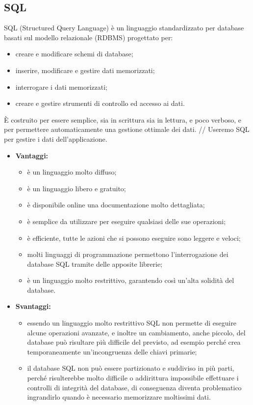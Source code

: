 \subsection{SQL}
	SQL (Structured Query Language) è un linguaggio standardizzato per database basati sul modello relazionale (RDBMS) progettato per:
	\begin{itemize}
		\item 	creare e modificare schemi di database;
		\item 	inserire, modificare e gestire dati memorizzati;
		\item 	interrogare i dati memorizzati;
		\item 	creare e gestire strumenti di controllo ed accesso ai dati.
	\end{itemize}
	È costruito per essere semplice, sia in scrittura sia in lettura, e poco verboso, e per permettere automaticamente una gestione ottimale dei dati. //
	Useremo SQL per gestire i dati dell'applicazione.
	
	\begin{itemize}
		\item \textbf{Vantaggi:}
			\begin{itemize}
				\item è un linguaggio molto diffuso;
				\item è un linguaggio libero e gratuito;
				\item è disponibile online una documentazione molto dettagliata;
				\item è semplice da utilizzare per eseguire qualsiasi delle sue operazioni;
				\item è efficiente, tutte le azioni che si possono eseguire sono leggere e veloci;
				\item molti linguaggi di programmazione permettono l'interrogazione dei database SQL tramite delle apposite librerie;
				\item è un linguaggio molto restrittivo, garantendo così un'alta solidità del database.
			\end{itemize}
		\item \textbf{Svantaggi:}
			\begin{itemize}
				\item essendo un linguaggio molto restrittivo SQL non permette di eseguire alcune operazioni avanzate, e inoltre un cambiamento, anche piccolo, del database può risultare più difficile del previsto, ad esempio perché crea temporaneamente un'incongruenza delle chiavi primarie;
				\item il database SQL non può essere partizionato e suddiviso in più parti, perché risulterebbe molto difficile o addirittura impossibile effettuare i controlli di integrità del database, di conseguenza diventa problematico ingrandirlo quando è necessario memorizzare moltissimi dati.
			\end{itemize}
	\end{itemize}
	
